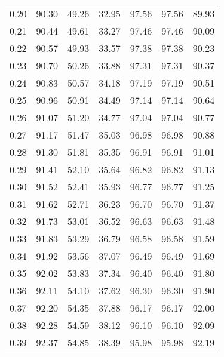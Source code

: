 \begin{tabular}{|c|c|c|c|c|c|c|}
      0.20 &     90.30 &     49.26 &      32.95 &   97.56 &      97.56 &         89.93 \\
      0.21 &     90.44 &     49.61 &      33.27 &   97.46 &      97.46 &         90.09 \\
      0.22 &     90.57 &     49.93 &      33.57 &   97.38 &      97.38 &         90.23 \\
      0.23 &     90.70 &     50.26 &      33.88 &   97.31 &      97.31 &         90.37 \\
      0.24 &     90.83 &     50.57 &      34.18 &   97.19 &      97.19 &         90.51 \\
      0.25 &     90.96 &     50.91 &      34.49 &   97.14 &      97.14 &         90.64 \\
      0.26 &     91.07 &     51.20 &      34.77 &   97.04 &      97.04 &         90.77 \\
      0.27 &     91.17 &     51.47 &      35.03 &   96.98 &      96.98 &         90.88 \\
      0.28 &     91.30 &     51.81 &      35.35 &   96.91 &      96.91 &         91.01 \\
      0.29 &     91.41 &     52.10 &      35.64 &   96.82 &      96.82 &         91.13 \\
      0.30 &     91.52 &     52.41 &      35.93 &   96.77 &      96.77 &         91.25 \\
      0.31 &     91.62 &     52.71 &      36.23 &   96.70 &      96.70 &         91.37 \\
      0.32 &     91.73 &     53.01 &      36.52 &   96.63 &      96.63 &         91.48 \\
      0.33 &     91.83 &     53.29 &      36.79 &   96.58 &      96.58 &         91.59 \\
      0.34 &     91.92 &     53.56 &      37.07 &   96.49 &      96.49 &         91.69 \\
      0.35 &     92.02 &     53.83 &      37.34 &   96.40 &      96.40 &         91.80 \\
      0.36 &     92.11 &     54.10 &      37.62 &   96.30 &      96.30 &         91.90 \\
      0.37 &     92.20 &     54.35 &      37.88 &   96.17 &      96.17 &         92.00 \\
      0.38 &     92.28 &     54.59 &      38.12 &   96.10 &      96.10 &         92.09 \\
      0.39 &     92.37 &     54.85 &      38.39 &   95.98 &      95.98 &         92.19 \\

\end{tabular}
